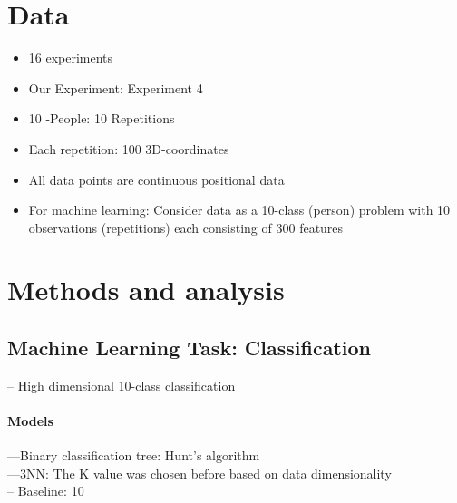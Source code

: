\documentclass[12pt,fleqn]{article}
\begin{document}
\section{Data}
\begin{itemize}
	\item 16 experiments
	\item Our Experiment: Experiment 4
	\item 10 -People: 10 Repetitions
	\item Each repetition: 100 3D-coordinates
	\item All data points are continuous positional data
	\item For machine learning: Consider data as a 10-class (person) problem with 10 observations (repetitions) each consisting of 300 features 
\end{itemize}
\begin{figure}[H]
		
	\centering
\end{figure}


\section{Methods and analysis}


\subsection{Machine Learning Task: Classification}
-- High dimensional 10-class classification 
\paragraph{Models}
---Binary classification tree: Hunt's algorithm\\
---3NN: The K value was chosen before based on data dimensionality\\
-- Baseline: 10\pro\\  
\end{document}
